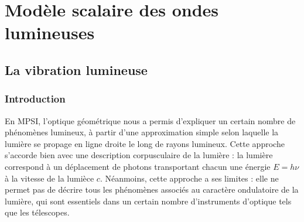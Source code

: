\documentclass[11pt,fleqn]{book} %
\begin{document}










\setcounter{chapter}{7}

\chapter{Modèle scalaire des ondes lumineuses}

\section{La vibration lumineuse}

\subsection{Introduction}

En MPSI, l'optique géométrique nous a permis d'expliquer un certain nombre de phénomènes lumineux, à partir d'une approximation simple selon laquelle la lumière se propage en ligne droite le long de rayons lumineux. Cette approche s'accorde bien avec une description corpusculaire de la lumière : la lumière correspond à un déplacement de photons transportant chacun une énergie $E = h \nu$ à la vitesse de la lumièce $c$. Néanmoins, cette approche a ses limites : elle ne permet pas de décrire tous les phénomènes associés au caractère ondulatoire de la lumière, qui sont essentiels dans un certain nombre d'instruments d'optique tels que les télescopes.
\end{document}
